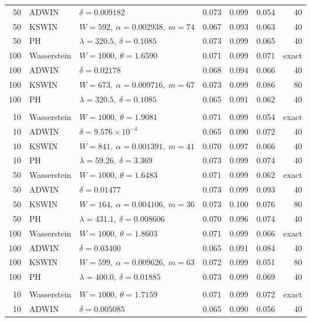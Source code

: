 \documentclass[preprint,12pt]{elsarticle}
\begin{document}
\begin{longtable}{rllrrrr}
50 & ADWIN & $\delta=0.009182$ & 0.073 & 0.099 & 0.054 & 40 \\*
50 & KSWIN & $W=592,\ \alpha=0.002938,\ m=74$ & 0.067 & 0.093 & 0.063 & 40 \\*
50 & PH & $\lambda=320.5,\ \delta=0.1085$ & 0.073 & 0.099 & 0.065 & 40 \\*
100 & Wasserstein & $W=1000,\ \theta=1.6590$ & 0.071 & 0.099 & 0.071 & exact \\*
100 & ADWIN & $\delta=0.02178$ & 0.068 & 0.094 & 0.066 & 40 \\*
100 & KSWIN & $W=673,\ \alpha=0.009716,\ m=67$ & 0.073 & 0.099 & 0.086 & 80 \\*
100 & PH & $\lambda=320.5,\ \delta=0.1085$ & 0.065 & 0.091 & 0.062 & 40 \\
\addlinespace
\multicolumn{7}{l}{\textit{River Friedman (shared)}}\\*
10 & Wasserstein & $W=1000,\ \theta=1.9081$ & 0.071 & 0.099 & 0.054 & exact \\*
10 & ADWIN & $\delta=9.576\times10^{-4}$ & 0.065 & 0.090 & 0.072 & 40 \\*
10 & KSWIN & $W=841,\ \alpha=0.001391,\ m=41$ & 0.070 & 0.097 & 0.066 & 40 \\*
10 & PH & $\lambda=59.26,\ \delta=3.369$ & 0.073 & 0.099 & 0.074 & 40 \\*
50 & Wasserstein & $W=1000,\ \theta=1.6483$ & 0.071 & 0.099 & 0.062 & exact \\*
50 & ADWIN & $\delta=0.01477$ & 0.073 & 0.099 & 0.093 & 40 \\*
50 & KSWIN & $W=164,\ \alpha=0.004106,\ m=36$ & 0.073 & 0.100 & 0.076 & 80 \\*
50 & PH & $\lambda=431.1,\ \delta=0.008606$ & 0.070 & 0.096 & 0.074 & 40 \\*
100 & Wasserstein & $W=1000,\ \theta=1.8603$ & 0.071 & 0.099 & 0.066 & exact \\*
100 & ADWIN & $\delta=0.03400$ & 0.065 & 0.091 & 0.084 & 40 \\*
100 & KSWIN & $W=599,\ \alpha=0.009626,\ m=63$ & 0.072 & 0.099 & 0.051 & 80 \\*
100 & PH & $\lambda=400.0,\ \delta=0.01885$ & 0.073 & 0.099 & 0.069 & 40 \\
\addlinespace
\multicolumn{7}{l}{\textit{Bimodal shift}}\\*
10 & Wasserstein & $W=1000,\ \theta=1.7159$ & 0.071 & 0.099 & 0.072 & exact \\*
10 & ADWIN & $\delta=0.005085$ & 0.065 & 0.090 & 0.056 & 40 \\*

\end{longtable}
\end{document}
